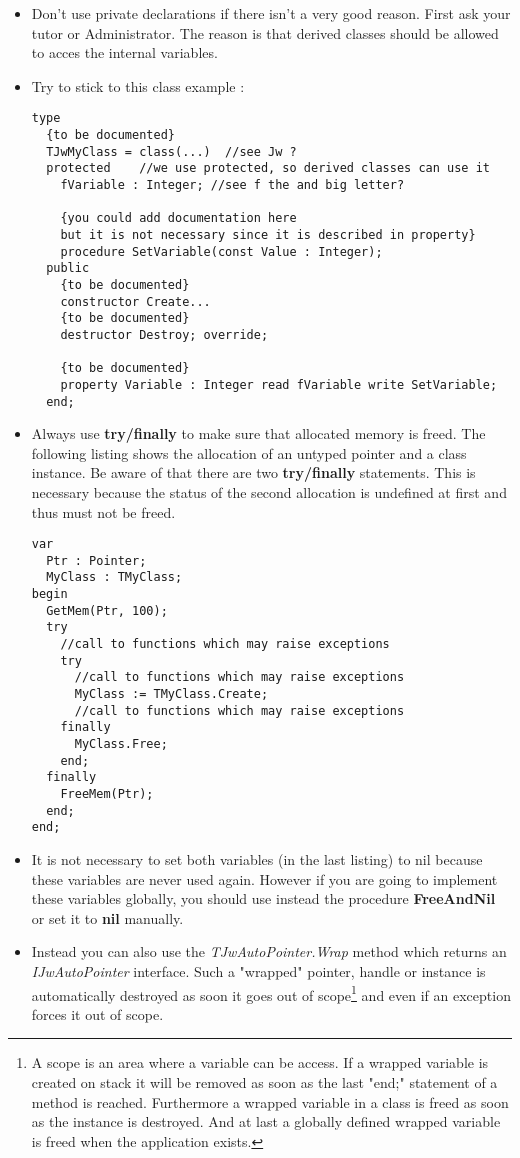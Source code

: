 \documentclass[a4paper,oneside,10pt]{article}
\begin{document}
\begin{itemize}
	\item Don't use private declarations if there isn't a very good reason. First ask your tutor or Administrator. The reason is that derived classes should be allowed to acces the internal variables.
	\item Try to stick to this class example :
\begin{lstlisting}	
type
  {to be documented}
  TJwMyClass = class(...)  //see Jw ?
  protected    //we use protected, so derived classes can use it
    fVariable : Integer; //see f the and big letter?

    {you could add documentation here
    but it is not necessary since it is described in property}
    procedure SetVariable(const Value : Integer);
  public
    {to be documented}
    constructor Create...
    {to be documented}
    destructor Destroy; override;

    {to be documented}
    property Variable : Integer read fVariable write SetVariable;
  end;	
\end{lstlisting}
 
\item Always use \textbf{try/finally} to make sure that allocated memory is freed. The following listing shows the allocation of an untyped pointer and a class instance. Be aware of that there are two \textbf{try/finally} statements. This is necessary because the status of the second allocation is undefined at first and thus must not be freed.

\begin{lstlisting}
var 
  Ptr : Pointer;
  MyClass : TMyClass;
begin
  GetMem(Ptr, 100);
  try
    //call to functions which may raise exceptions
    try
      //call to functions which may raise exceptions
      MyClass := TMyClass.Create;
      //call to functions which may raise exceptions
    finally
      MyClass.Free;
    end;
  finally
    FreeMem(Ptr);
  end;
end;
\end{lstlisting}

\item It is not necessary to set both variables (in the last listing) to nil because these variables are never used again. However if you are going to implement these variables globally, you should use instead the procedure \textbf{FreeAndNil} or set it to \textbf{nil} manually.

\item Instead you can also use the \textit{TJwAutoPointer.Wrap} method which returns an \textit{IJwAutoPointer} interface. Such a "wrapped" pointer, handle or instance is automatically destroyed as soon it goes out of scope\footnote{A scope is an area where a variable can be access. If a wrapped variable is created on stack it will be removed as soon as the last "end;" statement of a method is reached. Furthermore a wrapped variable in a class is freed as soon as the instance is destroyed. And at last a globally defined wrapped variable is freed when the application exists.} and even if an exception forces it out of scope.


\end{itemize}
\end{document}
